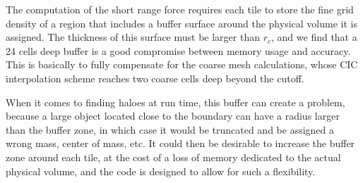 \documentclass[useAMS,usenatbib]{mn2e}
\begin{document}
The computation of the short range force requires each tile to store the fine grid density of a region that includes a buffer surface around the physical volume it is assigned. The thickness of this surface must be larger than $r_{c}$, and we find that a 24 cells deep buffer
is a good compromise between memory usage and accuracy.
This is basically to fully compensate for the coarse mesh calculations, whose CIC interpolation scheme 
reaches two coarse cells deep beyond the cutoff.   

When it comes to finding haloes at run time, this buffer can create a problem, because a large object located close to the boundary can have a radius larger than the buffer zone, in which case it would be truncated and be assigned a wrong mass, center of mass, etc. 
It could then be desirable to increase the buffer zone around each tile, at the cost of a loss of memory dedicated to the actual physical volume, and the code is designed to allow for such a flexibility.


\end{document}

